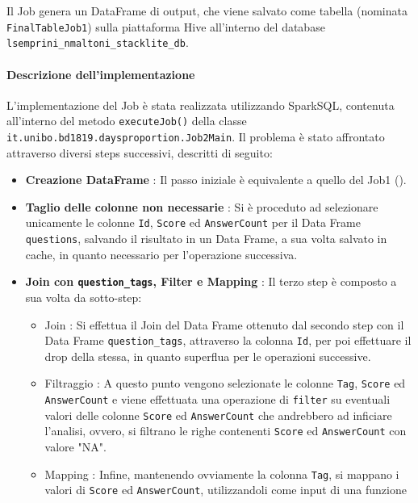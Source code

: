   Il Job genera un DataFrame di output, che viene salvato come tabella (nominata \texttt{FinalTableJob1})
  sulla piattaforma Hive all'interno del database \texttt{lsemprini\_nmaltoni\_stacklite\_db}.

  \paragraph{Descrizione dell'implementazione}\label{par:job2:spark:implementation}

  L'implementazione del Job è stata realizzata utilizzando SparkSQL, contenuta all'interno del metodo \texttt{executeJob()}
  della classe \texttt{it.unibo.bd1819.daysproportion.Job2Main}.
  Il problema è stato affrontato attraverso diversi steps successivi, descritti di seguito:

  \begin{itemize}
    \item \textbf{Creazione DataFrame} : Il passo iniziale è equivalente a quello del Job1
    ().
    \item \textbf{Taglio delle colonne non necessarie} : Si è proceduto ad selezionare unicamente le colonne \texttt{Id},
    \texttt{Score} ed \texttt{AnswerCount} per il Data Frame \texttt{questions}, salvando il risultato in un Data Frame,
    a sua volta salvato in cache, in quanto necessario per l'operazione successiva.
    \item \textbf{Join con \texttt{question\_tags}, Filter e Mapping} : Il terzo step è composto a sua volta da sotto-step:
    \begin{itemize}
      \item Join : Si effettua il Join del Data Frame ottenuto dal secondo step con il Data Frame \texttt{question\_tags}, attraverso
      la colonna \texttt{Id}, per poi effettuare il drop della stessa, in quanto superflua per le operazioni successive.
      \item Filtraggio : A questo punto vengono selezionate le colonne \texttt{Tag}, \texttt{Score} ed \texttt{AnswerCount}
      e viene effettuata una operazione di \texttt{filter} su eventuali valori delle colonne \texttt{Score} ed \texttt{AnswerCount}
      che andrebbero ad inficiare l'analisi, ovvero, si filtrano le righe contenenti \texttt{Score} ed \texttt{AnswerCount} con valore
      "NA".
      \item Mapping : Infine, mantenendo ovviamente la colonna \texttt{Tag},
      si mappano i valori di \texttt{Score} ed \texttt{AnswerCount}, utilizzandoli come input di una funzione

\end{itemize}
\end{itemize}
